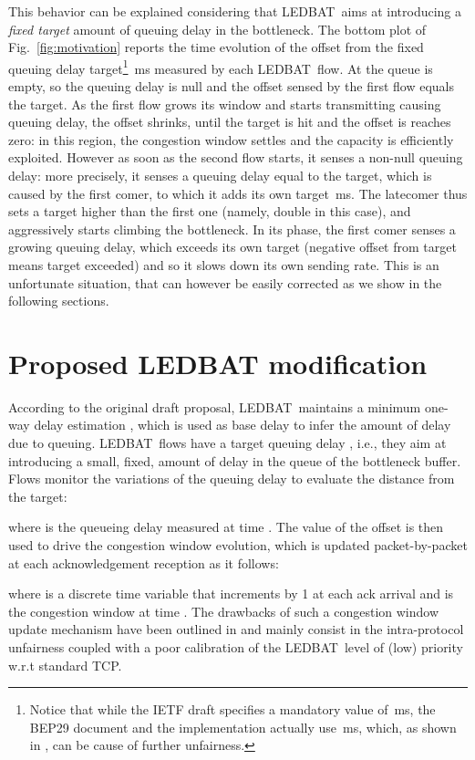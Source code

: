 \documentclass[conference]{IEEEtran}
\newcommand{\figR}[1]{Fig.~\ref{fig:#1}}
\newcommand{\btledbat}[0]{LEDBAT}
\begin{document}
This behavior can be explained considering that \btledbat\ aims at introducing a \emph{fixed target} amount of queuing delay in the bottleneck.
The bottom plot of \figR{motivation} reports the time evolution of the offset from the fixed queuing delay target\footnote{Notice that while the IETF draft specifies a mandatory value of \,ms, the BEP29 document and the implementation actually use \,ms, which, as shown in \cite{lcn10}, can be cause of further unfairness.} \mbox{\,ms} measured by each \btledbat\ flow. At  the queue is empty, so the queuing delay is null and the offset sensed by the first flow equals the target. As the first flow grows its window and starts transmitting causing queuing delay, the offset shrinks, until the target is hit and the offset is reaches zero: in this region, the congestion window settles and the capacity is efficiently exploited. However as soon as the second flow starts, it senses a non-null queuing delay: more precisely, it senses a queuing delay equal to the target, which is caused by the first comer, to which it adds its own target \,ms. The latecomer thus sets a target higher than the first one (namely, double in this case),  and aggressively starts climbing the bottleneck. In its phase, the first comer senses a growing queuing delay, which exceeds its own target (negative offset from target means target exceeded) and so it slows down its own sending rate. This is an unfortunate situation, that can however be easily corrected as we show in the following sections.



\section{Proposed LEDBAT modification}\label{sec:model}


 According to the original draft proposal\cite{ledbat_draft}, \btledbat\  maintains a minimum one-way delay estimation , which is used as base delay to infer the amount of delay due to queuing. \btledbat\ flows have a target queuing delay , i.e., they aim at introducing a small, fixed, amount of delay in the queue of the bottleneck buffer. Flows monitor the variations of the queuing delay  to evaluate the distance  from the target:

where   is the queueing delay measured at time .
The value of the offset  is then used to drive the congestion window evolution, which is updated packet-by-packet at each acknowledgement reception as it follows:

where  is a discrete time variable that increments by 1 at each ack arrival and  is the congestion window at time .
The drawbacks of such a congestion window update mechanism have been outlined in \cite{globecom10} and mainly 
consist in the intra-protocol unfairness coupled with a poor calibration of the \btledbat\ level of (low) priority 
w.r.t standard TCP.
\end{document}
